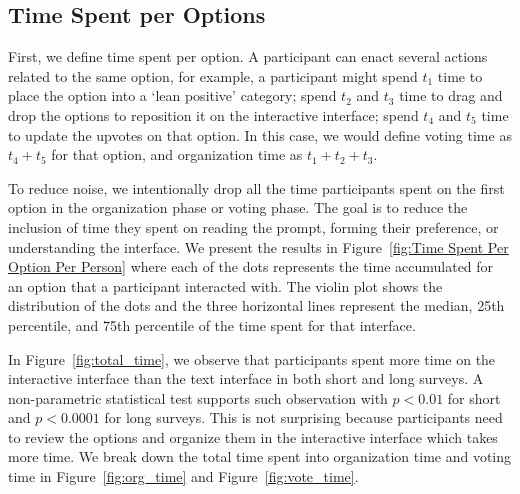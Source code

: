 \subsection{Time Spent per Options}
First, we define time spent per option. A participant can enact several actions related to the same option, for example, a participant might spend $t_1$ time to place the option into a `lean positive' category; spend $t_2$ and $t_3$ time to drag and drop the options to reposition it on the interactive interface; spend $t_4$ and $t_5$ time to update the upvotes on that option. In this case, we would define voting time as $t_4 + t_5$ for that option, and organization time as $t_1 + t_2 + t_3$.

To reduce noise, we intentionally drop all the time participants spent on the first option in the organization phase or voting phase. The goal is to reduce the inclusion of time they spent on reading the prompt, forming their preference, or understanding the interface. We present the results in Figure~\ref{fig:Time Spent Per Option Per Person} where each of the dots represents the time accumulated for an option that a participant interacted with. The violin plot shows the distribution of the dots and the three horizontal lines represent the median, 25th percentile, and 75th percentile of the time spent for that interface.

In Figure~\ref{fig:total_time}, we observe that participants spent more time on the interactive interface than the text interface in both short and long surveys. A non-parametric statistical test supports such observation with $p<0.01$ for short and $p<0.0001$ for long surveys.   This is not surprising because participants need to review the options and organize them in the interactive interface which takes more time. We break down the total time spent into organization time and voting time in Figure~\ref{fig:org_time} and Figure~\ref{fig:vote_time}.

